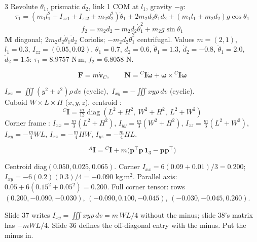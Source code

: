 \begin{multicols}{3}
Revolute $\theta_1$, prismatic $d_2$, link 1 COM at $l_1$, gravity $-y$:
\[\tau_1=(m_1l_1^2{+}I_{zz1}{+}I_{zz2}{+}m_2d_2^2)\ddot\theta_1+2m_2d_2\dot\theta_1\dot d_2+(m_1l_1{+}m_2d_2)g\cos\theta_1\]
\[f_2=m_2\ddot d_2-m_2d_2\dot\theta_1^2+m_2g\sin\theta_1\]
$\mathbf M$ diagonal; $2m_2d_2\dot\theta_1\dot d_2$ Coriolis; $-m_2d_2\dot\theta_1^2$ centrifugal. Values $m=(2,1)$, $l_1=0.3$, $I_{zz}=(0.05,0.02)$, $\theta_1=0.7$, $d_2=0.6$, $\dot\theta_1=1.3$, $\dot d_2=-0.8$, $\ddot\theta_1=2.0$, $\ddot d_2=1.5$: $\tau_1=8.9757$ N\,m, $f_2=6.8058$ N. \chk

\begin{fbx}
\[\mathbf F=m\dot{\mathbf v}_C,\qquad \mathbf N={}^C\mathbf I\dot{\boldsymbol\omega}+\boldsymbol\omega\times{}^C\mathbf I\boldsymbol\omega\]
\end{fbx}
\begin{fbx}
$I_{xx}=\iiint(y^2{+}z^2)\rho\,dv$ (cyclic),\ $I_{xy}=-\iiint xy\rho\,dv$ (cyclic).\\
Cuboid $W{\times}L{\times}H$ ($x,y,z$), centroid :
\[{}^C\mathbf I=\tfrac m{12}\operatorname{diag}(L^2{+}H^2,\ W^2{+}H^2,\ L^2{+}W^2)\]
Corner frame : $I_{xx}=\tfrac m3(L^2{+}H^2)$, $I_{yy}=\tfrac m3(W^2{+}H^2)$, $I_{zz}=\tfrac m3(L^2{+}W^2)$,\\
$I_{xy}=-\tfrac{m}{4}WL$, $I_{xz}=-\tfrac m4HW$, $I_{yz}=-\tfrac m4HL$.
\end{fbx}

\begin{fbx}
\[{}^A\mathbf I={}^C\mathbf I+m\big(\mathbf p^\top\mathbf p\,\mathbf 1_3-\mathbf p\mathbf p^\top\big)\]
\end{fbx}
\begin{worked}
Centroid diag$(0.050,0.025,0.065)$. Corner $I_{xx}=6(0.09{+}0.01)/3=0.200$; $I_{xy}=-6(0.2)(0.3)/4=-0.090$ kg\,m$^2$. Parallel axis: $0.05+6(0.15^2{+}0.05^2)=0.200$. Full corner tensor: rows $(0.200,-0.090,-0.030)$, $(-0.090,0.100,-0.045)$, $(-0.030,-0.045,0.260)$. \chk
\end{worked}
\begin{slideerr}[sign of $I_{xy}$]
Slide 37 writes $I_{xy}=\iiint xy\rho\,dv=m\,WL/4$ without the minus; slide 38's matrix has $-mWL/4$. Slide 36 defines the off-diagonal entry with the minus. Put the minus in.
\end{slideerr}


\end{multicols}
